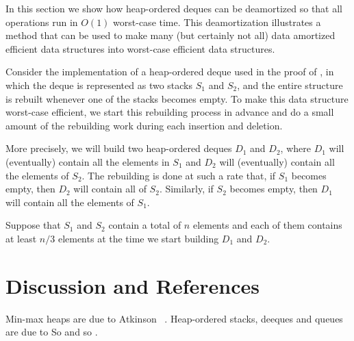 In this section we show how heap-ordered deques can be deamortized so that
all operations run in $O(1)$ worst-case time.  This deamortization
illustrates a method that can be used to make many (but certainly not all)
data amortized efficient data structures into worst-case efficient data
structures.

Consider the implementation of a heap-ordered deque used in the proof of
, in which the deque is represented as two stacks $S_1$
and $S_2$, and the entire structure is rebuilt whenever one of the stacks
becomes empty.  To make this data structure worst-case efficient, we 
start this rebuilding process in advance and do a small amount of the
rebuilding work during each insertion and deletion.

More precisely, we will build two heap-ordered deques $D_1$ and $D_2$,
where $D_1$ will (eventually) contain all the elements in $S_1$ and $D_2$
will (eventually) contain all the elements of $S_2$.  The rebuilding is
done at such a rate that, if $S_1$ becomes empty, then $D_2$ will contain
all of $S_2$.  Similarly, if $S_2$ becomes empty, then $D_1$ will contain
all the elements of $S_1$.

Suppose that $S_1$ and $S_2$ contain a total of $n$ elements and each of
them contains at least $n/3$ elements at the time we start building $D_1$
and $D_2$.

\section{Discussion and References}

Min-max heaps are due to Atkinson \etal\ \cite{asss89}.  Heap-ordered stacks, deeques and queues are due to So and so \cite{XX}.


